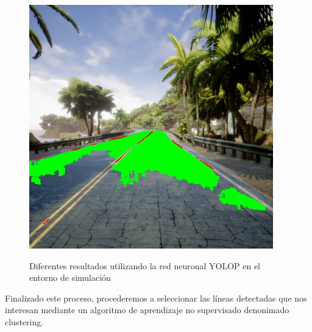 \begin{figure}[H]
\begin{center}
{      \includegraphics[scale=0.4]{figs/Plataformas_Desarollo/resultados-yolop/sitio1/ONNX-1280-1280.jpg}
      \label{f:yolop-1280-1280.onnx}}
  \caption{Diferentes resultados utilizando la red neuronal YOLOP en el entorno de simulación}
  \label{f:resultadosYOLOP}
  \end{center}
 \end{figure}

Finalizado este proceso, procederemos a seleccionar las líneas detectadas que nos interesan mediante un algoritmo de aprendizaje no supervisado denonimado clustering.


